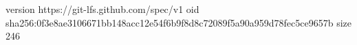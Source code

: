 version https://git-lfs.github.com/spec/v1
oid sha256:0f3e8ae3106671bb148acc12e54f6b9f8d8c72089f5a90a959d78fec5ce9657b
size 246
